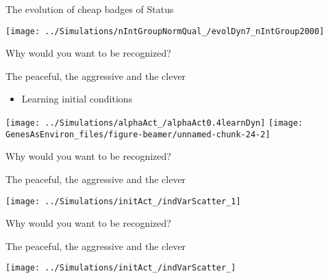 \documentclass[
  ignorenonframetext,
]{beamer}
\providecommand{\tightlist}{%
  \setlength{\itemsep}{0pt}\setlength{\parskip}{0pt}}
\begin{document}
\begin{frame}{The evolution of cheap badges of Status}
\protect\hypertarget{the-evolution-of-cheap-badges-of-status}{}

\begin{center}\texttt{[image: ../Simulations/nIntGroupNormQual\_/evolDyn7\_nIntGroup2000]} \end{center}

\end{frame}

\begin{frame}{Why would you want to be recognized?}
\protect\hypertarget{why-would-you-want-to-be-recognized}{}

\vspace{-1cm}

\begin{block}{The peaceful, the aggressive and the clever}

\begin{itemize}
\tightlist
\item
  Learning initial conditions
\end{itemize}

\texttt{[image: ../Simulations/alphaAct\_/alphaAct0.4learnDyn]}
\texttt{[image: GenesAsEnviron\_files/figure-beamer/unnamed-chunk-24-2]}

\end{block}

\end{frame}

\begin{frame}{Why would you want to be recognized?}
\protect\hypertarget{why-would-you-want-to-be-recognized-1}{}

\begin{block}{The peaceful, the aggressive and the clever}

\texttt{[image: ../Simulations/initAct\_/indVarScatter\_1]}

\end{block}

\end{frame}

\begin{frame}{Why would you want to be recognized?}
\protect\hypertarget{why-would-you-want-to-be-recognized-2}{}

\begin{block}{The peaceful, the aggressive and the clever}

\texttt{[image: ../Simulations/initAct\_/indVarScatter\_]}

\end{block}

\end{frame}
\end{document}
